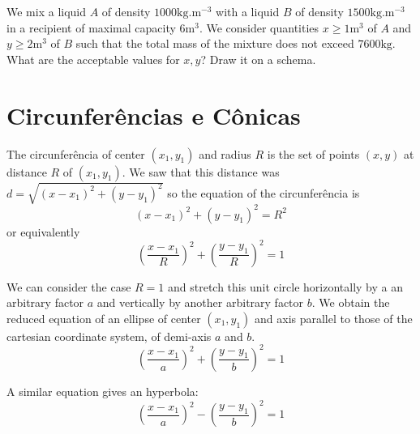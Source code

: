 We mix a liquid $A$ of density $1000 \text{kg}.\text{m}^{-3}$ with a liquid
$B$  of density $1500 \text{kg}.\text{m}^{-3}$ in a recipient of maximal
capacity $6\text{m}^3$. We consider quantities $x \geq 1 \text{m}^{3}$ of $A$
and $y \geq 2 \text{m}^{3}$ of $B$ such that the total mass of the mixture
does not exceed $7600\text{kg}$. What are the acceptable values for $x,y$?
Draw it on a schema.

\section{Circunferências e Cônicas}

The circunferência of center $(x_1,y_1)$ and radius $R$ is the set of points
$(x,y)$ at distance $R$ of $(x_1,y_1)$. We saw that this distance was
$d = \sqrt{{(x-x_1)}^2 + {(y-y_1)}^2}$ so the equation of the
circunferência is
$${(x-x_1)}^2 + {(y-y_1)}^2 = R^2$$
or equivalently
$${\left(\frac{x-x_1}{R}\right)}^2 + {\left(\frac{y-y_1}{R}\right)}^2 = 1$$
\begin{center}
\end{center}
We can consider the case $R=1$ and stretch this unit circle horizontally by a
an arbitrary factor $a$ and vertically by another arbitrary factor $b$.
We obtain the reduced equation of an
ellipse of center $(x_1,y_1)$ and axis parallel to those of the cartesian
coordinate system, of demi-axis $a$ and $b$.
$${\left(\frac{x-x_1}{a}\right)}^2 + {\left(\frac{y-y_1}{b}\right)}^2 = 1$$
\begin{center}
\end{center}
A similar equation gives an hyperbola:
$${\left(\frac{x-x_1}{a}\right)}^2 - {\left(\frac{y-y_1}{b}\right)}^2 = 1$$
